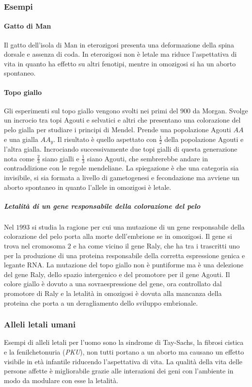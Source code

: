 \subsubsection{Esempi}
\paragraph{Gatto di Man}
Il gatto dell'isola di Man in eterozigosi presenta una deformazione della spina dorsale e assenza di coda. In eterozigosi non \`e letale ma riduce l'aspettativa di vita in quanto
ha effetto su altri fenotipi, mentre in omozigosi si ha un aborto spontaneo. 
\paragraph{Topo giallo}
Gli esperimenti sul topo giallo vengono svolti nei primi del $900$ da Morgan. Svolge un incrocio tra topi Agouti e selvatici e altri che presentano una colorazione del pelo gialla per
studiare i principi di Mendel. Prende una popolazione Agouti $AA$ e una gialla $AA_y$. Il risultato \`e quello aspettato con $\frac{1}{2}$ della popolazione Agouti e l'altra gialla. 
Incrociando successivamente due topi gialli di questa generazione nota come $\frac{2}{3}$ siano gialli e $\frac{1}{3}$ siano Agouti, che sembrerebbe andare in contraddizione con le
regole mendeliane. La spiegazione \`e che una categoria sia invisibile, si sia formata a livello di gametogenesi e fecondazione ma avviene un aborto spontaneo in quanto l'allele in 
omozigosi \`e letale.
\subparagraph{Letalit\`a di un gene responsabile della colorazione del pelo}
Nel $1993$ si studia la ragione per cui una mutazione di un gene responsabile della colorazione del pelo porta alla morte dell'embrione se in omozigosi. Il gene si trova nel cromosoma
$2$ e ha come vicino il gene Raly, che ha tra i trascritti uno per la produzione di una proteina responsabile della corretta espressione genica e legante RNA\@. La mutazione del topo 
giallo non \`e puntiforme ma \`e una delezione del gene Raly, dello spazio intergenico e del promotore per il gene Agouti. Il colore giallo \`e dovuto a una sovraespressione del gene,
ora controllato dal promotore di Raly e la letalit\`a in omozigosi \`e dovuta alla mancanza della proteina che porta a un deragliamento dello sviluppo embrionale. 
\subsubsection{Alleli letali umani}
Esempi di alleli letali per l'uomo sono la sindrome di Tay-Sachs, la fibrosi cistica e la fenilchetonuria (\emph{PKU}), non tutti portano a un aborto ma causano un effetto visibile in
et\`a infantile riducendo l'aspettativa di vita. La qualit\`a della vita delle persone affette \`e migliorabile grazie alle interazioni dei geni con l'ambiente in modo da modulare
con esse la letalit\`a. 
